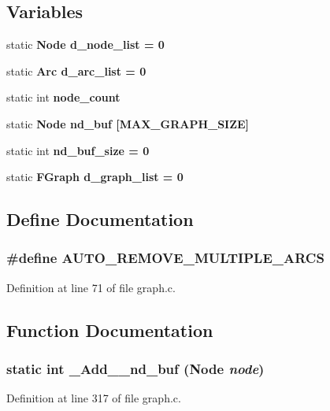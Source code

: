 \subsection*{Variables}
\begin{CompactItemize}
\item 
static \bf{Node} \bf{d\_\-node\_\-list} = 0
\item 
static \bf{Arc} \bf{d\_\-arc\_\-list} = 0
\item 
static int \bf{node\_\-count}
\item 
static \bf{Node} \bf{nd\_\-buf} [MAX\_\-GRAPH\_\-SIZE]
\item 
static int \bf{nd\_\-buf\_\-size} = 0
\item 
static \bf{FGraph} \bf{d\_\-graph\_\-list} = 0
\end{CompactItemize}


\subsection{Define Documentation}
\subsubsection{\setlength{\rightskip}{0pt plus 5cm}\#define AUTO\_\-REMOVE\_\-MULTIPLE\_\-ARCS}\label{graph_8c_6e49bebdb420d4af6d22e7979cd6efd8}




Definition at line 71 of file graph.c.

\subsection{Function Documentation}
\subsubsection{\setlength{\rightskip}{0pt plus 5cm}static int \_\-Add\_\_\-nd\_\-buf (\bf{Node} {\em node})\hspace{0.3cm}{\tt  [static]}}\label{graph_8c_84aa441b54e2bee2a1e7d74362986de7}




Definition at line 317 of file graph.c.

